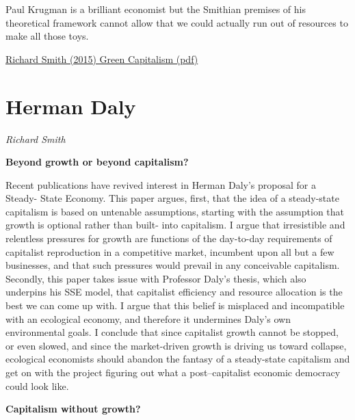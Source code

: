\documentclass[
]{book}
\begin{document}
Paul Krugman is a brilliant economist but the Smithian premises of his theoretical
framework cannot allow that we could actually run out of resources to make all
those toys.

\href{pdf/Richard_Smith_Green_Capitalism_the_God_that_Failed.pdf}{Richard Smith (2015) Green Capitalism (pdf)}

\hypertarget{herman-daly-1}{%
\section{Herman Daly}\label{herman-daly-1}}

\emph{Richard Smith}

\textbf{Beyond growth or beyond capitalism?}

Recent publications have revived interest in Herman
Daly's proposal for a Steady- State Economy. This paper argues,
first, that the idea of a steady-state capitalism is based on
untenable assumptions, starting with the assumption that growth is
optional rather than built- into capitalism. I argue that irresistible
and relentless pressures for growth are functions of the day-to-day
requirements of capitalist reproduction in a competitive market,
incumbent upon all but a few businesses, and that such pressures
would prevail in any conceivable capitalism. Secondly, this paper
takes issue with Professor Daly's thesis, which also underpins his
SSE model, that capitalist efficiency and resource allocation is the
best we can come up with. I argue that this belief is misplaced and
incompatible with an ecological economy, and therefore it
undermines Daly's own environmental goals. I conclude that since
capitalist growth cannot be stopped, or even slowed, and since the
market-driven growth is driving us toward collapse, ecological
economists should abandon the fantasy of a steady-state capitalism
and get on with the project figuring out what a post--capitalist
economic democracy could look like.

\textbf{Capitalism without growth?}
\end{document}
